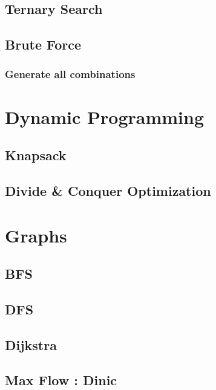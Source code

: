 \documentclass[10pt,landscape,twocolumn,a4paper,notitlepage]{article}
\begin{document}
  \subsection{Ternary Search}
  

  \subsection{Brute Force}
    \subsubsection{Generate all combinations}
    

\section{Dynamic Programming}
  \subsection{Knapsack}
  

  \subsection{Divide \& Conquer Optimization}
  

\section{Graphs}
  \subsection{BFS}
  

  \subsection{DFS}
  

  \subsection{Dijkstra}
  

  \subsection{Max Flow : Dinic}
  
\end{document}
